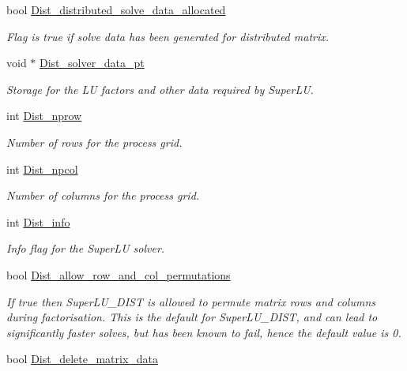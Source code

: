\begin{DoxyCompactItemize}
bool \hyperlink{classoomph_1_1SuperLUSolver_ae1058d90e75f3cc6229581382f159324}{Dist\+\_\+distributed\+\_\+solve\+\_\+data\+\_\+allocated}
\begin{DoxyCompactList}\small\item\em Flag is true if solve data has been generated for distributed matrix. \end{DoxyCompactList}\item 
void $\ast$ \hyperlink{classoomph_1_1SuperLUSolver_add0e2151ba6dffc2317f0ae63938b429}{Dist\+\_\+solver\+\_\+data\+\_\+pt}
\begin{DoxyCompactList}\small\item\em Storage for the LU factors and other data required by Super\+LU. \end{DoxyCompactList}\item 
int \hyperlink{classoomph_1_1SuperLUSolver_af46267ceb2fe5b52e1460dd827cc9593}{Dist\+\_\+nprow}
\begin{DoxyCompactList}\small\item\em Number of rows for the process grid. \end{DoxyCompactList}\item 
int \hyperlink{classoomph_1_1SuperLUSolver_ae377dc4f0d37fa9ba3056ed8d9bdcd35}{Dist\+\_\+npcol}
\begin{DoxyCompactList}\small\item\em Number of columns for the process grid. \end{DoxyCompactList}\item 
int \hyperlink{classoomph_1_1SuperLUSolver_ab9792c27162920763f77861f30c552d1}{Dist\+\_\+info}
\begin{DoxyCompactList}\small\item\em Info flag for the Super\+LU solver. \end{DoxyCompactList}\item 
bool \hyperlink{classoomph_1_1SuperLUSolver_ab7477cbe49c517e2ee39ad6eedcf6f63}{Dist\+\_\+allow\+\_\+row\+\_\+and\+\_\+col\+\_\+permutations}
\begin{DoxyCompactList}\small\item\em If true then Super\+L\+U\+\_\+\+D\+I\+ST is allowed to permute matrix rows and columns during factorisation. This is the default for Super\+L\+U\+\_\+\+D\+I\+ST, and can lead to significantly faster solves, but has been known to fail, hence the default value is 0. \end{DoxyCompactList}\item 
bool \hyperlink{classoomph_1_1SuperLUSolver_a0c44f15dfab9ac11376a8272fcf0a3b4}{Dist\+\_\+delete\+\_\+matrix\+\_\+data}

\end{DoxyCompactItemize}
